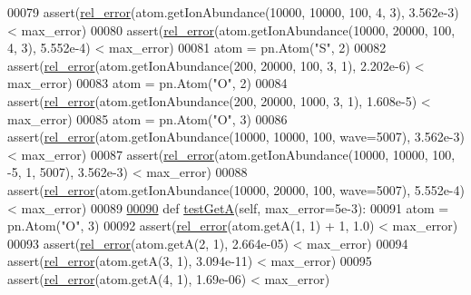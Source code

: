 \begin{DoxyCode}
00079                 assert(\hyperlink{namespacepyneb_1_1test_1_1unit_test_aff3b7f847905c444d8b10727f10de236}{rel\_error}(atom.getIonAbundance(10000, 10000, 100, 4, 3), 3.562e-3) < 
      max\_error)
00080                 assert(\hyperlink{namespacepyneb_1_1test_1_1unit_test_aff3b7f847905c444d8b10727f10de236}{rel\_error}(atom.getIonAbundance(10000, 20000, 100, 4, 3), 5.552e-4) < 
      max\_error)
00081                 atom = pn.Atom(\textcolor{stringliteral}{"S"}, 2)
00082                 assert(\hyperlink{namespacepyneb_1_1test_1_1unit_test_aff3b7f847905c444d8b10727f10de236}{rel\_error}(atom.getIonAbundance(200, 20000, 100, 3, 1), 2.202e-6) < 
      max\_error)
00083                 atom = pn.Atom(\textcolor{stringliteral}{"O"}, 2)
00084                 assert(\hyperlink{namespacepyneb_1_1test_1_1unit_test_aff3b7f847905c444d8b10727f10de236}{rel\_error}(atom.getIonAbundance(200, 20000, 1000, 3, 1), 1.608e-5) < 
      max\_error)
00085                 atom = pn.Atom(\textcolor{stringliteral}{"O"}, 3)
00086                 assert(\hyperlink{namespacepyneb_1_1test_1_1unit_test_aff3b7f847905c444d8b10727f10de236}{rel\_error}(atom.getIonAbundance(10000, 10000, 100, wave=5007), 3.562e-3) < 
      max\_error)
00087                 assert(\hyperlink{namespacepyneb_1_1test_1_1unit_test_aff3b7f847905c444d8b10727f10de236}{rel\_error}(atom.getIonAbundance(10000, 10000, 100, -5, 1, 5007), 3.562e-3) <
       max\_error)
00088                 assert(\hyperlink{namespacepyneb_1_1test_1_1unit_test_aff3b7f847905c444d8b10727f10de236}{rel\_error}(atom.getIonAbundance(10000, 20000, 100, wave=5007), 5.552e-4) < 
      max\_error)
00089 
\hypertarget{unit_test_8py_source_l00090}{}\hyperlink{classpyneb_1_1test_1_1unit_test_1_1_unit_test_a2aacf1ea25a476599f1e7cf83de571b2}{00090}         \textcolor{keyword}{def }\hyperlink{classpyneb_1_1test_1_1unit_test_1_1_unit_test_a2aacf1ea25a476599f1e7cf83de571b2}{testGetA}(self, max\_error=5e-3):
00091                 atom = pn.Atom(\textcolor{stringliteral}{"O"}, 3)
00092                 assert(\hyperlink{namespacepyneb_1_1test_1_1unit_test_aff3b7f847905c444d8b10727f10de236}{rel\_error}(atom.getA(1, 1) + 1, 1.0) < max\_error)
00093                 assert(\hyperlink{namespacepyneb_1_1test_1_1unit_test_aff3b7f847905c444d8b10727f10de236}{rel\_error}(atom.getA(2, 1), 2.664e-05) < max\_error)
00094                 assert(\hyperlink{namespacepyneb_1_1test_1_1unit_test_aff3b7f847905c444d8b10727f10de236}{rel\_error}(atom.getA(3, 1), 3.094e-11) < max\_error)
00095                 assert(\hyperlink{namespacepyneb_1_1test_1_1unit_test_aff3b7f847905c444d8b10727f10de236}{rel\_error}(atom.getA(4, 1), 1.69e-06) < max\_error)

\end{DoxyCode}
